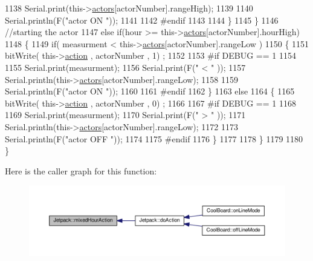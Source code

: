 \begin{DoxyCode}
1138                 Serial.print(this->\hyperlink{class_jetpack_a7e16d2f97837f9712a2e6de1c50d99db}{actors}[actorNumber].rangeHigh);
1139 
1140                 Serial.println(F(\textcolor{stringliteral}{"actor ON "}));
1141 
1142 \textcolor{preprocessor}{            #endif  }
1143                 
1144             \}
1145     \}
1146     \textcolor{comment}{//starting the actor}
1147     \textcolor{keywordflow}{else} \textcolor{keywordflow}{if}(hour >= this->\hyperlink{class_jetpack_a7e16d2f97837f9712a2e6de1c50d99db}{actors}[actorNumber].hourHigh)
1148     \{
1149             \textcolor{keywordflow}{if}( measurment < this->\hyperlink{class_jetpack_a7e16d2f97837f9712a2e6de1c50d99db}{actors}[actorNumber].rangeLow )
1150             \{
1151                 bitWrite( this->\hyperlink{class_jetpack_aca3142925a7b0834b34ae91d26af7765}{action} , actorNumber , 1) ;
1152 
1153 \textcolor{preprocessor}{            #if DEBUG == 1 }
1154 
1155                 Serial.print(measurment);
1156                 Serial.print(F(\textcolor{stringliteral}{" < "} ));
1157                 Serial.println(this->\hyperlink{class_jetpack_a7e16d2f97837f9712a2e6de1c50d99db}{actors}[actorNumber].rangeLow);
1158 
1159                 Serial.println(F(\textcolor{stringliteral}{"actor ON "}));
1160 
1161 \textcolor{preprocessor}{            #endif  }
1162             \}
1163             \textcolor{keywordflow}{else} 
1164             \{
1165                 bitWrite( this->\hyperlink{class_jetpack_aca3142925a7b0834b34ae91d26af7765}{action} , actorNumber , 0) ;
1166 
1167 \textcolor{preprocessor}{            #if DEBUG == 1 }
1168 
1169                 Serial.print(measurment);
1170                 Serial.print(F(\textcolor{stringliteral}{" > "} ));
1171                 Serial.println(this->\hyperlink{class_jetpack_a7e16d2f97837f9712a2e6de1c50d99db}{actors}[actorNumber].rangeLow);
1172 
1173                 Serial.println(F(\textcolor{stringliteral}{"actor OFF "}));
1174 
1175 \textcolor{preprocessor}{            #endif                  }
1176             \}
1177 
1178     \}
1179 
1180 \}
\end{DoxyCode}
Here is the caller graph for this function\+:
\nopagebreak
\begin{figure}[H]
\begin{center}
\leavevmode
\includegraphics[width=350pt]{df/d1d/class_jetpack_ac1a49ab4867718cdb415ad74c2066b9d_icgraph}
\end{center}
\end{figure}
\mbox{\label{class_jetpack_a273dae1517b56f0242e28b8944edc26b}} 
